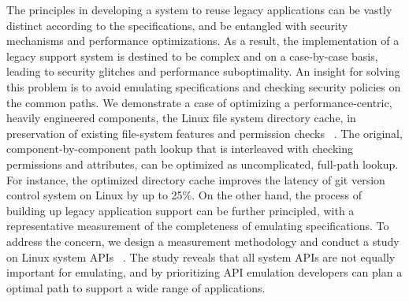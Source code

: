 

The principles in developing a system to reuse legacy applications
can be vastly distinct according to the specifications,
and be entangled with security mechanisms and performance optimizations.
As a result, 
the implementation of a legacy support system
is destined to be complex and 
on a case-by-case basis,
leading to security glitches and performance suboptimality.
An insight
for solving this problem %
is to avoid
emulating specifications and checking security policies
on the common paths.
We demonstrate a case of optimizing a performance-centric, heavily engineered components,
the Linux file system directory cache,
in preservation of existing file-system features and permission checks
~\citep{tsai15dcache}.
The original, component-by-component path lookup
that is interleaved with checking permissions and attributes,
can be optimized as uncomplicated, full-path lookup.
For instance, the optimized directory cache improves the latency of git version control system on Linux by up to 25\%.
On the other hand,
the process of building up legacy application support
can be further principled,
with a representative measurement of the completeness of emulating specifications.
To address the concern,
we design a measurement methodology and conduct a study on Linux system APIs
~\citep{tsai16apistudy}.
The study reveals that all system APIs are not equally important for emulating,
and by prioritizing API emulation
developers can plan a optimal path to support a wide range of applications.


